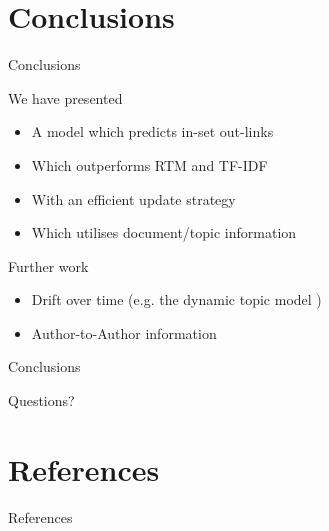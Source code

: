 \documentclass[xcolor=dvipsnames]{beamer}
\begin{document}

\section{Conclusions}
\begin{frame}{Conclusions}

We have presented
\begin{itemize}
    \item A model which predicts in-set out-links 
    \item Which outperforms RTM and TF-IDF
    \item With an efficient update strategy
    \item Which utilises document/topic information 
\end{itemize}
Further work
\begin{itemize}
    \item Drift over time (e.g. the dynamic topic model \cite{Blei2006a})
    \item Author-to-Author information
\end{itemize}

\end{frame}

\begin{frame}{Conclusions}

Questions?

\end{frame}




\section{References}
\begin{frame}[allowframebreaks]{References}

{\tiny 
    
    
}

\end{frame}
\end{document}

